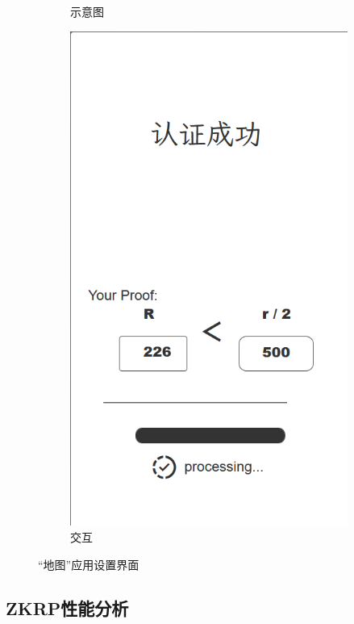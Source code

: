 \documentclass[zihao=-4]{ctexart}
\begin{document}
\begin{figure}[htbp]
\begin{subfigure}{0.31\textwidth}
    \caption{示意图}
  \end{subfigure}%
  \hspace*{2cm}   %
  \begin{subfigure}{0.31\textwidth}
    \includegraphics[width=\linewidth]{前端-认证成功.jpg}
    \caption{交互} 
  \end{subfigure}
\caption{“地图”应用设置界面}
\label{verify}
\end{figure}
\subsection{ZKRP性能分析}
\end{document}
